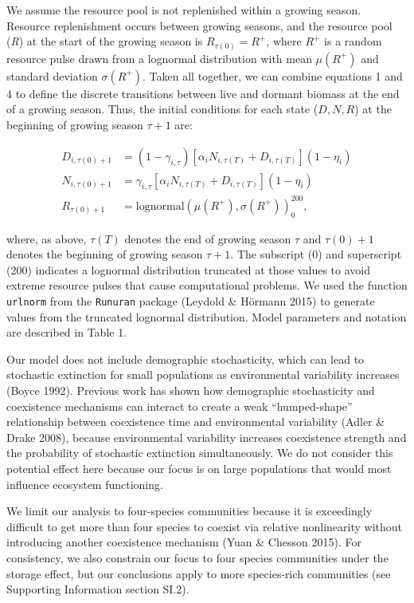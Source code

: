 \documentclass[12pt,]{article}
\begin{document}
We assume the resource pool is not replenished within a growing season.
Resource replenishment occurs between growing seasons, and the resource
pool (\emph{R}) at the start of the growing season is
\(R_{\tau(0)} = R^+\), where \(R^+\) is a random resource pulse drawn
from a lognormal distribution with mean \(\mu(R^+)\) and standard
deviation \(\sigma(R^+)\). Taken all together, we can combine equations
1 and 4 to define the discrete transitions between live and dormant
biomass at the end of a growing season. Thus, the initial conditions for
each state (\(D, N, R\)) at the beginning of growing season \(\tau+1\)
are: \vspace{-3em}

\begin{align}
  D_{i,\tau(0) + 1} &= (1-\gamma_{i,\tau}) \left[\alpha_i N_{i,\tau(T)} + D_{i,\tau(T)} \right] (1-\eta_i) \\
  N_{i,\tau(0) + 1} &= \gamma_{i,\tau} \left[\alpha_i N_{i,\tau(T)} + D_{i,\tau(T)} \right] (1-\eta_i) \\
  R_{\tau(0) + 1} &= \text{lognormal}\left(\mu(R^+), \sigma(R^+) \right)_0^{200},
\end{align}\vspace{-3em}

\noindent where, as above, \(\tau(T)\) denotes the end of growing season
\(\tau\) and \(\tau(0) + 1\) denotes the beginning of growing season
\(\tau+1\). The subscript (0) and superscript (200) indicates a
lognormal distribution truncated at those values to avoid extreme
resource pulses that cause computational problems. We used the function
\texttt{urlnorm} from the \texttt{Runuran} package (Leydold \& Hörmann
2015) to generate values from the truncated lognormal distribution.
Model parameters and notation are described in Table 1.

Our model does not include demographic stochasticity, which can lead to
stochastic extinction for small populations as environmental variability
increases (Boyce 1992). Previous work has shown how demographic
stochasticity and coexistence mechanisms can interact to create a weak
``humped-shape'' relationship between coexistence time and environmental
variability (Adler \& Drake 2008), because environmental variability
increases coexistence strength and the probability of stochastic
extinction simultaneously. We do not consider this potential effect here
because our focus is on large populations that would most influence
ecosystem functioning.

We limit our analysis to four-species communities because it is
exceedingly difficult to get more than four species to coexist via
relative nonlinearity without introducing another coexistence mechanism
(Yuan \& Chesson 2015). For consistency, we also constrain our focus to
four species communities under the storage effect, but our conclusions
apply to more species-rich communities (see Supporting Information
section SI.2).
\end{document}
